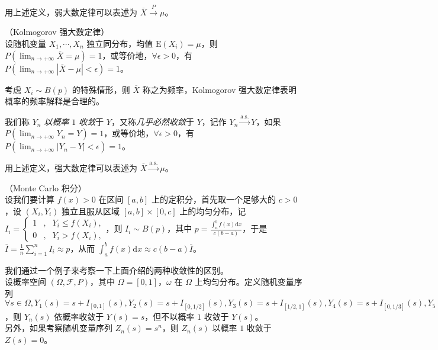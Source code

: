 \documentclass[../main.tex]{subfiles}
\begin{document}
用上述定义，弱大数定律可以表述为 $\overline X\overset{P}{\rightarrow}\mu$。

\begin{theorem}\label{thm:5.2.2}
    （Kolmogorov 强大数定律）\\
    设随机变量 $X_1,\cdots,X_n$ 独立同分布，均值 $\mathrm E(X_i)=\mu$，则 $P(\lim_{n\rightarrow+\infty}\overline X=\mu)=1$，或等价地，$\forall \epsilon>0$，有 $P(\lim_{n\rightarrow+\infty}|\overline X-\mu|<\epsilon)=1$。
\end{theorem}

考虑 $X_i\sim B(p)$ 的特殊情形，则 $\overline X$ 称之为频率，Kolmogorov 强大数定律表明概率的频率解释是合理的。

\begin{definition}\label{def:5.2.2}
    我们称 $Y_n$ \emph{以概率 $1$ 收敛}于 $Y$，又称\emph{几乎必然收敛}于 $Y$，记作 $Y_n\overset{\mathrm{a.s.}}{\rightarrow}Y$，如果 $P(\lim_{n\rightarrow+\infty}Y_n=Y)=1$，或等价地，$\forall \epsilon>0$，有 $P(\lim_{n\rightarrow+\infty}|Y_n-Y|<\epsilon)=1$。
\end{definition}

用上述定义，强大数定律可以表述为 $\overline X\overset{\mathrm{a.s.}}{\rightarrow}\mu$。

\begin{example}
    （Monte Carlo 积分）\\
    设我们要计算 $f(x)>0$ 在区间 $[a,b]$ 上的定积分，首先取一个足够大的 $c>0$，设 $(X_i,Y_i)$ 独立且服从区域 $[a,b]\times[0,c]$ 上的均匀分布，记 $I_i=\left\{
        \begin{aligned}
            1 & , & Y_i\leq f(X_i), \\
            0 & , & Y_i>f(X_i),
        \end{aligned}
        \right.$，则 $I_i\sim B(p)$，其中 $p=\frac{\int_a^b f(x)\mathrm{d}x}{c(b-a)}$，于是 $\overline I=\frac1n\sum_{i=1}^nI_i\approx p$，从而 $\int_a^b f(x)\mathrm{d}x\approx c(b-a)\overline I$。
\end{example}

\begin{example}
    我们通过一个例子来考察一下上面介绍的两种收敛性的区别。\\
    设概率空间 $(\Omega,\mathcal F,P)$，其中 $\Omega=[0,1]$，$\omega$ 在 $\Omega$ 上均匀分布。定义随机变量序列 $\forall s\in\Omega,Y_1(s)=s+I_{[0,1]}(s),Y_2(s)=s+I_{[0,1/2]}(s),Y_3(s)=s+I_{[1/2,1]}(s),Y_4(s)=s+I_{[0,1/3]}(s),Y_5(s)=s+I_{[1/3,2/3]}(s),Y_6(s)=s+I_{[2/3,1]}(s),\cdots$，则 $Y_n(s)$ 依概率收敛于 $Y(s)=s$，但不以概率 $1$ 收敛于 $Y(s)$。\\
    另外，如果考察随机变量序列 $Z_n(s)=s^n$，则 $Z_n(s)$ 以概率 $1$ 收敛于 $Z(s)=0$。
\end{example}
\end{document}
